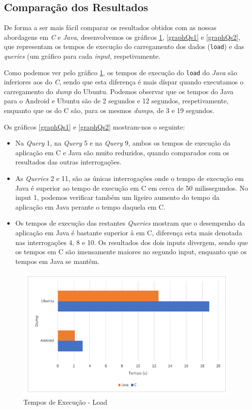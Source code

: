 \documentclass[a4paper, 11pt, oneside]{article}
\begin{document}
\subsection{Comparação dos Resultados}

De forma a ser mais fácil comparar os resultados obtidos com as nossas abordagens em \textit{C} e \textit{Java},
desenvolvemos os gráficos \ref{graphLoad}, \ref{graphQs1} e \ref{graphQs2}, que representam os tempos de execução do carregamento dos dados (\texttt{load}) e das \textit{queries} (um gráfico para cada \textit{input}, respetivamente.


Como podemos ver pelo gráfico \ref{graphLoad}, os tempos de execução do \texttt{load} do \textit{Java} são inferiores aos do \textit{C}, sendo que esta diferença é mais díspar quando executamos o carregamento do \textit{dump} do Ubuntu. Podemos observar que os tempos do Java para o Android e Ubuntu são de 2 segundos e 12 segundos, respetivamente, enquanto que os do C são, para os mesmos \textit{dumps}, de 3 e 19 segundos.

Os gráficos \ref{graphQs1} e \ref{graphQs2} mostram-nos o seguinte:
\begin{itemize}
\item Na \textit{Query} 1, na \textit{Query} 5 e na \textit{Query} 9, ambos os tempos de execução da aplicação em C e Java são muito reduzidos, quando comparados com os resultados das outras interrogações.
\item As \textit{Queries} 2 e 11, são as únicas interrogações onde o tempo de execução em Java é superior ao tempo de execução em C em cerca de 50 milissegundos. No input 1, podemos verificar também um ligeiro aumento do tempo da aplicação em Java perante o tempo daquela em C.
\item Os tempos de execução das restantes \textit{Queries} mostram que o desempenho da aplicação em Java é bastante superior à em C, diferença esta mais denotada nas interrogações 4, 8 e 10. Os resultados dos dois inputs divergem, sendo que os tempos em C são imensamente maiores no segundo input, enquanto que os tempos em Java se mantêm.
\end{itemize}

\begin{figure}[h]
\centering
\includegraphics[scale=.5]{loads.png}
\caption{Tempos de Execução - Load \label{graphLoad}}
\end{figure}
\end{document}
